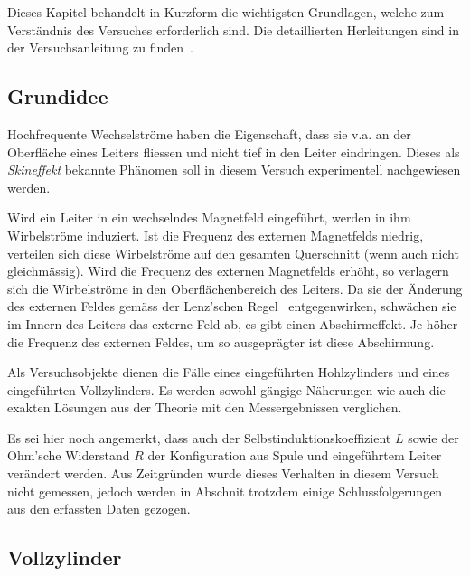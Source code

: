 Dieses Kapitel  behandelt in Kurzform  die wichtigsten Grundlagen,  welche zum
Verst\"andnis des Versuches erforderlich sind. Die detaillierten Herleitungen
sind in der Versuchsanleitung zu finden~\cite{ref:looser:skineffekt}.

\subsection{Grundidee}
\label{sec:arbgru:subsec:grundidee}

Hochfrequente  Wechselstr\"ome  haben  die   Eigenschaft,  dass  sie  v.a.  an
der  Oberfl\"ache  eines  Leiters  fliessen  und  nicht  tief  in  den  Leiter
eindringen. Dieses als  \emph{Skineffekt} bekannte  Ph\"anomen soll  in diesem
Versuch experimentell nachgewiesen werden.

Wird  ein  Leiter  in  ein  wechselndes  Magnetfeld  eingef\"uhrt,  werden  in
ihm  Wirbelstr\"ome  induziert. Ist  die  Frequenz  des  externen  Magnetfelds
niedrig,  verteilen sich  diese  Wirbelstr\"ome auf  den gesamten  Querschnitt
(wenn auch  nicht gleichm\"assig). Wird die Frequenz  des externen Magnetfelds
erh\"oht, so verlagern sich die Wirbelstr\"ome in den Oberfl\"achenbereich des
Leiters. Da sie  der \"Anderung  des externen  Feldes gem\"ass  der Lenz'schen
Regel~\cite{ref:wikipedia:lenzscheRegel}  entgegenwirken,  schw\"achen sie  im
Innern des  Leiters das  externe Feld  ab, es  gibt einen  Abschirmeffekt.  Je
h\"oher  die Frequenz  des externen  Feldes,  um so  ausgepr\"agter ist  diese
Abschirmung.

Als Versuchsobjekte dienen die  F\"alle eines eingef\"uhrten Hohlzylinders und
eines  eingef\"uhrten Vollzylinders. Es werden  sowohl g\"angige  N\"aherungen
wie  auch die  exakten  L\"osungen  aus der  Theorie  mit den  Messergebnissen
verglichen.

Es  sei  hier  noch   angemerkt,  dass  auch  der  Selbstinduktionskoeffizient
$L$  sowie  der  Ohm'sche  Widerstand  $R$ der  Konfiguration  aus  Spule  und
eingef\"uhrtem  Leiter   ver\"andert  werden. Aus Zeitgr\"unden  wurde  dieses
Verhalten in diesem Versuch nicht
gemessen, jedoch werden in Abschnit %
trotzdem einige Schlussfolgerungen aus den erfassten Daten gezogen.


\subsection{Vollzylinder}
\label{sec:arbgru:subsec:vollzylinder}

